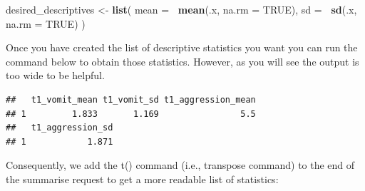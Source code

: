 \documentclass[
]{krantz}
\makeatletter
\newenvironment{Shaded}{\begin{snugshade}}{\end{snugshade}}
\newcommand{\DataTypeTok}[1]{\textcolor[rgb]{0.27,0.27,0.27}{#1}}
\newcommand{\KeywordTok}[1]{\textcolor[rgb]{0.27,0.27,0.27}{\textbf{#1}}}
\newcommand{\NormalTok}[1]{#1}
\newcommand{\OperatorTok}[1]{\textcolor[rgb]{0.43,0.43,0.43}{\textbf{#1}}}
\newcommand{\OtherTok}[1]{\textcolor[rgb]{0.37,0.37,0.37}{#1}}
\newcommand{\StringTok}[1]{\textcolor[rgb]{0.5,0.5,0.5}{#1}}
\newenvironment{kframe}{%
\medskip{}
\setlength{\fboxsep}{.8em}
 \def\at@end@of@kframe{}%
 \ifinner\ifhmode%
  \def\at@end@of@kframe{\end{minipage}}%
  \begin{minipage}{\columnwidth}%
 \fi\fi%
 \def\FrameCommand##1{\hskip\@totalleftmargin \hskip-\fboxsep
 \colorbox{shadecolor}{##1}\hskip-\fboxsep
     \hskip-\linewidth \hskip-\@totalleftmargin \hskip\columnwidth}%
 \MakeFramed {\advance\hsize-\width
   \@totalleftmargin\z@ \linewidth\hsize
   \@setminipage}}%
 {\par\unskip\endMakeFramed%
 \at@end@of@kframe}
\renewenvironment{Shaded}{\begin{kframe}}{\end{kframe}}
\makeatother
\begin{document}
\begin{Shaded}
\begin{Highlighting}[]
\NormalTok{desired_descriptives <-}\StringTok{ }\KeywordTok{list}\NormalTok{(}
  \DataTypeTok{mean =} \OperatorTok{~}\KeywordTok{mean}\NormalTok{(.x, }\DataTypeTok{na.rm =} \OtherTok{TRUE}\NormalTok{),}
  \DataTypeTok{sd =} \OperatorTok{~}\KeywordTok{sd}\NormalTok{(.x, }\DataTypeTok{na.rm =} \OtherTok{TRUE}\NormalTok{)}
\NormalTok{)}
\end{Highlighting}
\end{Shaded}

Once you have created the list of descriptive statistics you want you can run the command below to obtain those statistics. However, as you will see the output is too wide to be helpful.

\begin{Shaded}
\end{Shaded}

\begin{verbatim}
##   t1_vomit_mean t1_vomit_sd t1_aggression_mean
## 1         1.833       1.169                5.5
##   t1_aggression_sd
## 1            1.871
\end{verbatim}

Consequently, we add the t() command (i.e., transpose command) to the end of the summarise request to get a more readable list of statistics:

\begin{Shaded}
\end{Shaded}
\end{document}

